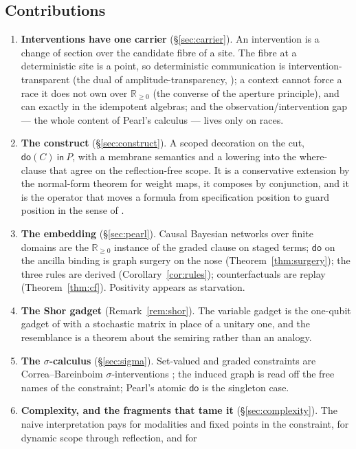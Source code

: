 \documentclass[11pt,a4paper]{article}
\theoremstyle{plain}
\theoremstyle{definition}
\theoremstyle{remark}
\newcommand{\Rnn}{\mathbb{R}_{\geq 0}}
\newcommand{\dok}{\textsf{do}}
\newcommand{\ink}{\textsf{in}}
\begin{document}
\subsection{Contributions}

\begin{enumerate}[leftmargin=1.4em,itemsep=3pt]
\item \textbf{Interventions have one carrier} (\S\ref{sec:carrier}). An
intervention is a change of section over the candidate fibre of a site. The
fibre at a deterministic site is a point, so deterministic communication is
intervention-transparent (the dual of amplitude-transparency,
\cite[Prop.~8.5]{GradedV4}); a context cannot force a race it does not own over
$\Rnn$ (the converse of the aperture principle), and can exactly in the
idempotent algebras; and the observation/intervention gap --- the whole content
of Pearl's calculus --- lives only on races.
\item \textbf{The construct} (\S\ref{sec:construct}). A scoped decoration on
the cut, $\dok(C)\ \ink\ P$, with a membrane semantics and a lowering into the
where-clause that agree on the reflection-free scope. It is a conservative
extension by the normal-form theorem for weight maps, it composes by
conjunction, and it is the operator that moves a formula from specification
position to guard position in the sense of \cite{Omnibus}.
\item \textbf{The embedding} (\S\ref{sec:pearl}). Causal Bayesian networks over
finite domains are the $\Rnn$ instance of the graded clause on staged terms;
$\dok$ on the ancilla binding is graph surgery on the nose
(Theorem~\ref{thm:surgery}); the three rules are derived
(Corollary~\ref{cor:rules}); counterfactuals are replay
(Theorem~\ref{thm:cf}). Positivity appears as starvation.
\item \textbf{The Shor gadget} (Remark~\ref{rem:shor}). The variable gadget is
the one-qubit gadget of \cite{GradedQuantum} with a stochastic matrix in place
of a unitary one, and the resemblance is a theorem about the semiring rather
than an analogy.
\item \textbf{The $\sigma$-calculus} (\S\ref{sec:sigma}). Set-valued and graded
constraints are Correa--Bareinboim $\sigma$-interventions
\cite{CorreaBareinboim}; the induced graph is read off the free names of the
constraint; Pearl's atomic $\dok$ is the singleton case.
\item \textbf{Complexity, and the fragments that tame it}
(\S\ref{sec:complexity}). The naive interpretation pays for modalities and
fixed points in the constraint, for dynamic scope through reflection, and for

\end{enumerate}
\end{document}
